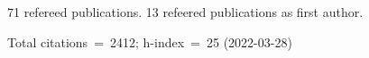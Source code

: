 71 refereed publications. 13 refeered publications as first author.

Total citations~=~2412; h-index~=~25 (2022-03-28)